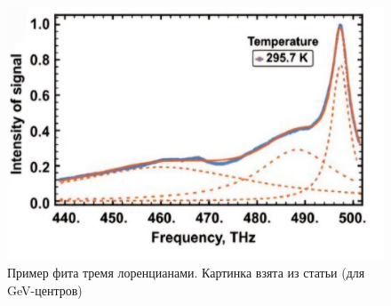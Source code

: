 \begin{figure}[!h]
    \begin{center}
        \includegraphics[width=0.7 \linewidth]{Example of fitting.jpg}
        \caption{Пример фита тремя лоренцианами. Картинка взята из статьи 
        \cite{Therm} (для GeV-центров)}
        \label{Example of fitting}
    \end{center}
\end{figure}

